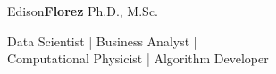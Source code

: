 \begin{center}
    {\fontsize{50}{40}\selectfont Edison\textbf{Florez}}
    \hspace*{5mm}
    {\fontsize{20}{40}\selectfont Ph.D., M.Sc.}

    \vspace*{3mm}
    \Large{
        Data Scientist | Business Analyst | \\
        Computational Physicist | Algorithm Developer
    }
\end{center}
